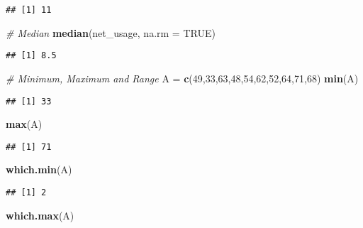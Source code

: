 \documentclass[
]{article}
\newenvironment{Shaded}{\begin{snugshade}}{\end{snugshade}}
\newcommand{\AttributeTok}[1]{\textcolor[rgb]{0.13,0.29,0.53}{#1}}
\newcommand{\CommentTok}[1]{\textcolor[rgb]{0.56,0.35,0.01}{\textit{#1}}}
\newcommand{\ConstantTok}[1]{\textcolor[rgb]{0.56,0.35,0.01}{#1}}
\newcommand{\DecValTok}[1]{\textcolor[rgb]{0.00,0.00,0.81}{#1}}
\newcommand{\FunctionTok}[1]{\textcolor[rgb]{0.13,0.29,0.53}{\textbf{#1}}}
\newcommand{\NormalTok}[1]{#1}
\newcommand{\OtherTok}[1]{\textcolor[rgb]{0.56,0.35,0.01}{#1}}
\begin{document}
\begin{verbatim}
## [1] 11
\end{verbatim}

\begin{Shaded}
\begin{Highlighting}[]
\CommentTok{\# Median}
\FunctionTok{median}\NormalTok{(net\_usage, }\AttributeTok{na.rm =} \ConstantTok{TRUE}\NormalTok{)}
\end{Highlighting}
\end{Shaded}

\begin{verbatim}
## [1] 8.5
\end{verbatim}

\begin{Shaded}
\begin{Highlighting}[]
\CommentTok{\# Minimum, Maximum and Range}
\NormalTok{A }\OtherTok{=} \FunctionTok{c}\NormalTok{(}\DecValTok{49}\NormalTok{,}\DecValTok{33}\NormalTok{,}\DecValTok{63}\NormalTok{,}\DecValTok{48}\NormalTok{,}\DecValTok{54}\NormalTok{,}\DecValTok{62}\NormalTok{,}\DecValTok{52}\NormalTok{,}\DecValTok{64}\NormalTok{,}\DecValTok{71}\NormalTok{,}\DecValTok{68}\NormalTok{)}
\FunctionTok{min}\NormalTok{(A)}
\end{Highlighting}
\end{Shaded}

\begin{verbatim}
## [1] 33
\end{verbatim}

\begin{Shaded}
\begin{Highlighting}[]
\FunctionTok{max}\NormalTok{(A)}
\end{Highlighting}
\end{Shaded}

\begin{verbatim}
## [1] 71
\end{verbatim}

\begin{Shaded}
\begin{Highlighting}[]
\FunctionTok{which.min}\NormalTok{(A)}
\end{Highlighting}
\end{Shaded}

\begin{verbatim}
## [1] 2
\end{verbatim}

\begin{Shaded}
\begin{Highlighting}[]
\FunctionTok{which.max}\NormalTok{(A)}
\end{Highlighting}
\end{Shaded}
\end{document}
